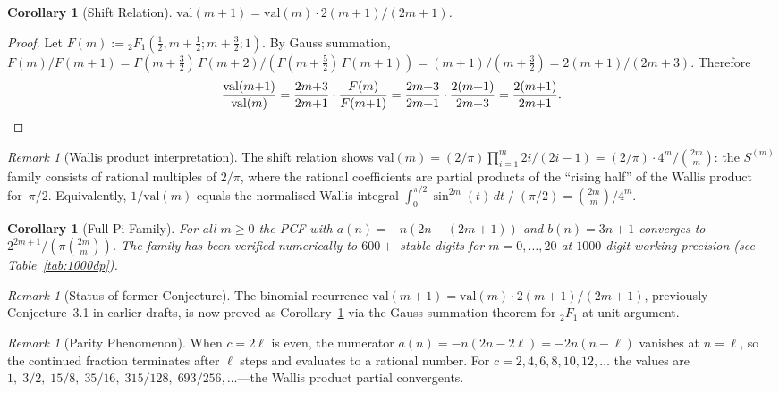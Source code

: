 \documentclass[11pt,a4paper]{article}
\theoremstyle{plain}
\newtheorem{corollary}[theorem]{Corollary}
\theoremstyle{remark}
\newtheorem{remark}[theorem]{Remark}
\begin{document}
\begin{corollary}[Shift Relation]\label{cor:shift}
$\mathrm{val}(m{+}1) = \mathrm{val}(m)\cdot 2(m{+}1)/(2m{+}1)$.
\end{corollary}
\begin{proof}
Let $F(m) := {}_2F_1(\frac12, m{+}\frac12; m{+}\frac32; 1)$.
By Gauss summation,
$F(m)/F(m{+}1) = \Gamma(m{+}\frac32)\,\Gamma(m{+}2) / 
  (\Gamma(m{+}\frac52)\,\Gamma(m{+}1))
  = (m{+}1)/(m{+}\frac32) = 2(m{+}1)/(2m{+}3)$.
Therefore
\[
  \frac{\mathrm{val}(m{+}1)}{\mathrm{val}(m)}
  = \frac{2m{+}3}{2m{+}1}\cdot\frac{F(m)}{F(m{+}1)}
  = \frac{2m{+}3}{2m{+}1}\cdot\frac{2(m{+}1)}{2m{+}3}
  = \frac{2(m{+}1)}{2m{+}1}.  \qedhere
\]
\end{proof}

\begin{remark}[Wallis product interpretation]\label{rem:wallis-prod}
The shift relation shows $\mathrm{val}(m) = (2/\pi)\prod_{i=1}^m 2i/(2i{-}1)
= (2/\pi)\cdot 4^m/\binom{2m}{m}$:
the $S^{(m)}$ family consists of rational multiples of $2/\pi$,
where the rational coefficients are partial products of the
``rising half'' of the Wallis product for~$\pi/2$.
Equivalently, $1/\mathrm{val}(m)$ equals the normalised Wallis integral
$\int_0^{\pi/2}\!\sin^{2m}(t)\,dt \;/\; (\pi/2)
= \binom{2m}{m}/4^m$.
\end{remark}

\begin{corollary}[Full Pi Family]\label{cor:pi}
For all $m \ge 0$ the PCF with
$a(n) = -n(2n{-}(2m{+}1))$ and $b(n) = 3n+1$ converges to
$2^{2m+1}/(\pi\binom{2m}{m})$.
The family has been verified numerically to $600{+}$ stable digits
for $m = 0,\ldots,20$ at $1000$-digit working precision
(see Table~\ref{tab:1000dp}).
\end{corollary}

\begin{remark}[Status of former Conjecture]\label{rem:conj-resolved}
The binomial recurrence $\mathrm{val}(m{+}1) = \mathrm{val}(m)\cdot
2(m{+}1)/(2m{+}1)$, previously Conjecture~3.1 in earlier drafts,
is now proved as Corollary~\ref{cor:shift}
via the Gauss summation theorem for ${}_2F_1$ at unit argument.
\end{remark}

\begin{remark}[Parity Phenomenon]\label{rem:parity}
When $c = 2\ell$ is even, the numerator $a(n) = -n(2n{-}2\ell) = -2n(n{-}\ell)$
vanishes at $n = \ell$, so the continued fraction terminates
after $\ell$ steps and evaluates to a rational number.
For $c = 2,4,6,8,10,12,\ldots$ the values are
$1,\;3/2,\;15/8,\;35/16,\;315/128,\;693/256,\ldots$---the
Wallis product partial convergents.
\end{remark}
\end{document}
